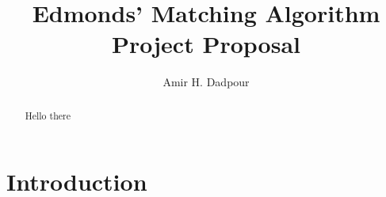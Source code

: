 \documentclass[acmsmall, screen, nonacm]{acmart}
\begin{document}
\title{Edmonds' Matching Algorithm Project Proposal}
\author{Amir H. Dadpour}


\begin{abstract}
	Hello there
\end{abstract}


\maketitle

\section{Introduction}



\end{document}
